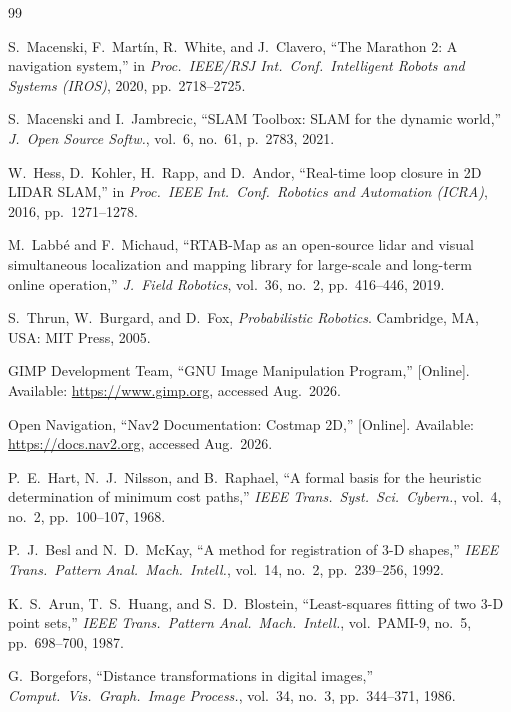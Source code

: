 \documentclass[journal]{IEEEtran}
\begin{document}
\begin{thebibliography}{99}
\scriptsize
\setlength{\itemsep}{0pt}
\setlength{\parskip}{0pt}

S.~Macenski, F.~Martín, R.~White, and J.~Clavero,
``The Marathon 2: A navigation system,''
in \emph{Proc.\ IEEE/RSJ Int.\ Conf.\ Intelligent Robots and Systems (IROS)},
2020, pp.\ 2718--2725.

S.~Macenski and I.~Jambrecic,
``SLAM Toolbox: SLAM for the dynamic world,''
\emph{J.\ Open Source Softw.}, vol.~6, no.~61, p.~2783, 2021.

W.~Hess, D.~Kohler, H.~Rapp, and D.~Andor,
``Real-time loop closure in 2D LIDAR SLAM,''
in \emph{Proc.\ IEEE Int.\ Conf.\ Robotics and Automation (ICRA)},
2016, pp.\ 1271--1278.

M.~Labbé and F.~Michaud,
``RTAB-Map as an open-source lidar and visual simultaneous localization and
mapping library for large-scale and long-term online operation,''
\emph{J.\ Field Robotics}, vol.~36, no.~2, pp.\ 416--446, 2019.

S.~Thrun, W.~Burgard, and D.~Fox,
\emph{Probabilistic Robotics}.
Cambridge, MA, USA: MIT Press, 2005.

GIMP Development Team,
``GNU Image Manipulation Program,''
[Online]. Available: \url{https://www.gimp.org}, accessed Aug.\ 2026.

Open Navigation,
``Nav2 Documentation: Costmap 2D,''
[Online]. Available: \url{https://docs.nav2.org}, accessed Aug.\ 2026.

P.~E.~Hart, N.~J.~Nilsson, and B.~Raphael,
``A formal basis for the heuristic determination of minimum cost paths,''
\emph{IEEE Trans.\ Syst.\ Sci.\ Cybern.}, vol.~4, no.~2, pp.\ 100--107, 1968.

P.~J.~Besl and N.~D.~McKay,
``A method for registration of 3-D shapes,''
\emph{IEEE Trans.\ Pattern Anal.\ Mach.\ Intell.}, vol.~14, no.~2,
pp.\ 239--256, 1992.

K.~S.~Arun, T.~S.~Huang, and S.~D.~Blostein,
``Least-squares fitting of two 3-D point sets,''
\emph{IEEE Trans.\ Pattern Anal.\ Mach.\ Intell.}, vol.~PAMI-9, no.~5,
pp.\ 698--700, 1987.

G.~Borgefors,
``Distance transformations in digital images,''
\emph{Comput.\ Vis.\ Graph.\ Image Process.}, vol.~34, no.~3,
pp.\ 344--371, 1986.


\end{thebibliography}
\end{document}

